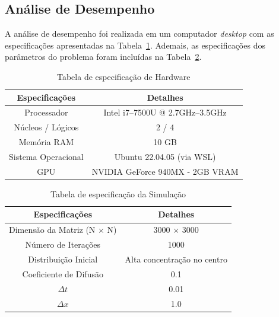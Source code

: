 \documentclass[12pt]{article}
\begin{document}
\subsection{Análise de Desempenho}

A análise de desempenho foi realizada em um computador \textit{desktop} com as
especificações apresentadas na Tabela~\ref{tab:especificacaoHardware}. Ademais,
as especificações dos parâmetros do problema foram incluídas na
Tabela~\ref{tab:especificacaoSimulacao}.

\begin{table}[ht]
  \centering
  \caption{Tabela de especificação de Hardware}
  \vspace{0.3cm}
  \begin{tabular}{||c c||}
    \hline
    Especificações      & Detalhes                         \\ [0.5ex]
    \hline\hline
    Processador         & Intel i7--7500U @ 2.7GHz--3.5GHz \\
    \hline
    Núcleos / Lógicos   & 2 / 4                            \\
    \hline
    Memória RAM         & 10 GB                            \\
    \hline
    Sistema Operacional & Ubuntu 22.04.05 (via WSL)        \\
    \hline
    GPU                 & NVIDIA GeForce 940MX - 2GB VRAM  \\
    \hline
  \end{tabular}\label{tab:especificacaoHardware}
\end{table}

\begin{table}[ht]
  \centering
  \caption{Tabela de especificação da Simulação}
  \vspace{0.3cm}
  \begin{tabular}{||c c||}
    \hline
    Especificações             & Detalhes                    \\ [0.5ex]
    \hline\hline
    Dimensão da Matriz (N $\times$ N) & 3000 $\times$ 3000                 \\
    \hline
    Número de Iterações        & 1000                        \\
    \hline
    Distribuição Inicial       & Alta concentração no centro \\
    \hline
    Coeficiente de Difusão     & 0.1                         \\
    \hline
    $\Delta t$                 & 0.01                        \\
    \hline
    $\Delta x$                 & 1.0                         \\
    \hline
  \end{tabular}\label{tab:especificacaoSimulacao}
\end{table}
\end{document}

